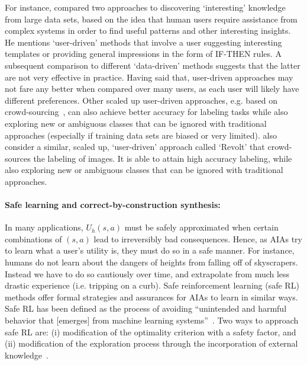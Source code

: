 For instance, \citet{Freitas2006-qo} compared two approaches to discovering `interesting' knowledge from large data sets, based on the idea that human users require assistance from complex systems in order to find useful patterns and other interesting insights. He mentions `user-driven' methods that involve a user suggesting interesting templates or providing general impressions in the form of IF-THEN rules. A subsequent comparison to different `data-driven' methods suggests that the latter are not very effective in practice. 
Having said that, user-driven approaches may not fare any better when compared over many users, as each user will likely have different preferences. Other scaled up user-driven approaches, e.g. based on crowd-sourcing~\citet{Chang2017-kl}, can also achieve better accuracy for labeling tasks while also exploring new or ambiguous classes that can be ignored with traditional approaches (especially if training data sets are biased or very limited). \citet{Chang2017-kl} also consider a similar, scaled up, `user-driven' approach called `Revolt' that crowd-sources the labeling of images. It is able to attain high accuracy labeling, while also exploring new or ambiguous classes that can be ignored with traditional approaches. 



\paragraph{Safe learning and correct-by-construction synthesis:}
In many applications, $U_h(s,a)$ must be safely approximated when certain combinations of $(s,a)$ lead to irreversibly bad consequences. 
Hence, as AIAs try to learn what a user's utility is, they must do so in a safe manner. 
For instance, humans do not learn about the dangers of heights from falling off of skyscrapers. 
Instead we have to do so cautiously over time, and extrapolate from much less drastic experience (i.e. tripping on a curb). 
Safe reinforcement learning (safe RL) methods offer formal strategies and assurances for AIAs to learn in similar ways.
Safe RL has been defined as the process of avoiding ``unintended and harmful behavior that [emerges] from machine learning systems''~\cite{Amodei2016-xi}. Two ways to approach safe RL are: (i) modification of the optimality criterion with a safety factor, and (ii) modification of the exploration process through the incorporation of external knowledge~\cite{Garcia2015-rs}. 

